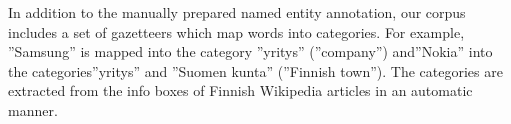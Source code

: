 \documentclass[11pt]{article}
\begin{document}
In addition to the manually prepared named entity annotation, our corpus includes a set of gazetteers which map words into categories. For example, ''Samsung'' is mapped into the category ''yritys'' (''company'') and''Nokia'' into the categories''yritys'' and ''Suomen kunta'' (''Finnish town''). The categories are extracted from the info boxes of Finnish Wikipedia articles in an automatic manner.












\end{document}
